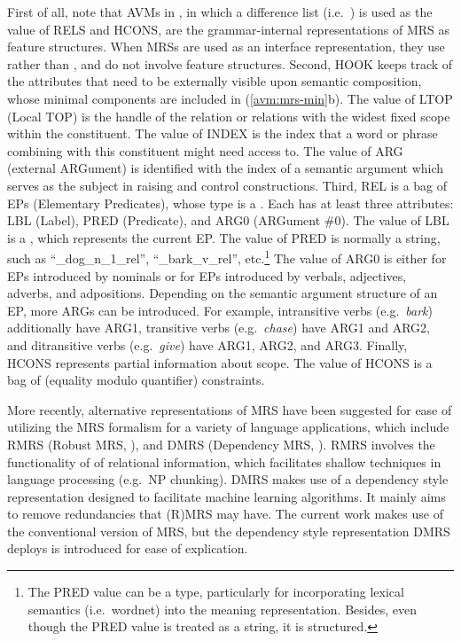 \noindent First of all, note that AVMs in , in
which a difference list (i.e.\ ) is used as the value
of RELS and HCONS, are the grammar-internal representations of MRS as
feature structures.  When MRSs are used as an interface
representation, they use  rather than , and
do not involve feature structures. Second, HOOK keeps track of the
attributes that need to be externally visible upon semantic
composition, whose minimal components are included in
(\ref{avm:mrs-min}b). The value of LTOP (Local TOP) is the handle of
the relation or relations with the widest fixed scope within the
constituent. The value of INDEX is the index that a word or phrase
combining with this constituent might need access to. The value of ARG
(external ARGument) is identified with the index of a semantic
argument which serves as the subject in raising and control
constructions.
Third, REL is a bag of EPs (Elementary Predicates),
whose type is a . Each  has at least three
attributes: LBL (Label), PRED (Predicate), and ARG0 (ARGument
\#0). The value of LBL is a , which represents the current
EP. The value of PRED is normally a string, such as
``\_dog\_n\_1\_rel'', ``\_bark\_v\_rel'', etc.\footnote{The PRED value can
  be a type, particularly for incorporating lexical semantics
  (i.e.\ wordnet) into the meaning representation. Besides, even
  though the PRED value is treated as a string, it is structured.}
The value of ARG0 is either  for EPs introduced by
nominals or  for EPs introduced by verbals, adjectives,
adverbs, and adpositions.  Depending on the semantic argument
structure of an EP, more ARGs can be introduced. For example,
intransitive verbs (e.g.\ \textit{bark}) additionally have ARG1,
transitive verbs (e.g.\ \textit{chase}) have ARG1 and ARG2, and
ditransitive verbs (e.g.\ \textit{give}) have ARG1, ARG2, and
ARG3. Finally, HCONS represents partial information about scope.  The
value of HCONS is a bag of  (equality modulo quantifier)
constraints.


More recently, alternative representations of MRS have been suggested
for ease of utilizing the MRS formalism for a variety of language
applications, which include RMRS (Robust MRS, \citealt{copestake:07}),
and DMRS (Dependency MRS, \citealt{copestake:09}).  RMRS involves the
functionality of  of relational information,
which facilitates shallow techniques in language processing (e.g.\ NP
chunking).  DMRS makes use of a dependency style representation
designed to facilitate machine learning algorithms. It mainly aims to
remove redundancies that (R)MRS may have.  The current work makes use
of the conventional version of MRS, but the dependency style
representation DMRS deploys is introduced for ease of explication.



